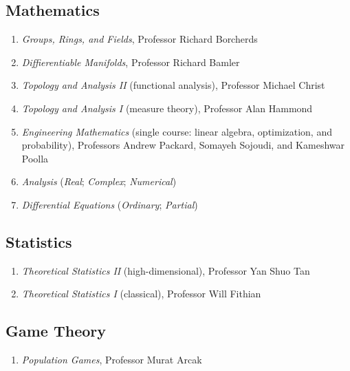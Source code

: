 \begin{coursework}
	\vspace*{\subsectionskip}
	
	\subsection{Mathematics}
	\begin{enumerate}[label=\arabic*.]
		\item \textit{Groups, Rings, and Fields}, Professor Richard Borcherds
		\item \textit{Diffierentiable Manifolds}, Professor Richard Bamler
		\item \textit{Topology and Analysis II} (functional analysis), Professor Michael Christ
		\item \textit{Topology and Analysis I} (measure theory), Professor Alan Hammond
		\item \textit{Engineering Mathematics} (single course: linear algebra, optimization, and probability), Professors Andrew Packard, Somayeh Sojoudi, and Kameshwar Poolla
		\item \textit{Analysis} (\textit{Real}; \textit{Complex}; \textit{Numerical})
		\item \textit{Differential Equations} (\textit{Ordinary}; \textit{Partial})
	\end{enumerate}
	
	\vspace*{\subsectionskip}

	\subsection{Statistics}
	\begin{enumerate}[label=\arabic*.]
		\item \textit{Theoretical Statistics II} (high-dimensional), Professor Yan Shuo Tan
		\item \textit{Theoretical Statistics I} (classical), Professor Will Fithian
	\end{enumerate}

	\vspace*{\subsectionskip}

	\subsection{Game Theory}
	\begin{enumerate}[label=\arabic*.]
		\item \textit{Population Games}, Professor Murat Arcak
	\end{enumerate}
\end{coursework}
